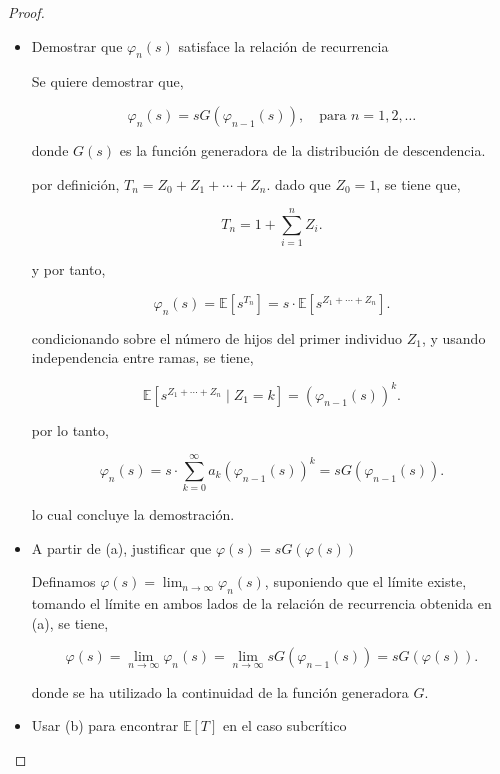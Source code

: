 \documentclass{article}
\begin{document}
\begin{proof}
\begin{itemize}
\item[(a)] Demostrar que \( \varphi_n(s) \) satisface la relación de recurrencia

Se quiere demostrar que,

\[
\varphi_n(s) = s G(\varphi_{n-1}(s)), \quad \text{para } n = 1, 2, \ldots
\]

donde \( G(s) \) es la función generadora de la distribución de descendencia.

por definición, \( T_n = Z_0 + Z_1 + \cdots + Z_n \). dado que \( Z_0 = 1 \), se tiene que,

\[
T_n = 1 + \sum_{i=1}^{n} Z_i.
\]

y por tanto,

\[
\varphi_n(s) = \mathbb{E}[s^{T_n}] = s \cdot \mathbb{E}[s^{Z_1 + \cdots + Z_n}].
\]

condicionando sobre el número de hijos del primer individuo \( Z_1 \), y usando independencia entre ramas, se tiene,

\[
\mathbb{E}[s^{Z_1 + \cdots + Z_n} \mid Z_1 = k] = \left( \varphi_{n-1}(s) \right)^k.
\]

por lo tanto,

\[
\varphi_n(s) = s \cdot \sum_{k=0}^{\infty} a_k \left( \varphi_{n-1}(s) \right)^k = s G(\varphi_{n-1}(s)).
\]

lo cual concluye la demostración.

    
\end{itemize}

\begin{itemize}

\item[(b)] A partir de (a), justificar que \( \varphi(s) = s G(\varphi(s)) \)

Definamos \( \varphi(s) = \lim_{n \to \infty} \varphi_n(s) \), suponiendo que el límite existe, tomando el límite en ambos lados de la relación de recurrencia obtenida en (a), se tiene,

\[
\varphi(s) = \lim_{n \to \infty} \varphi_n(s) = \lim_{n \to \infty} s G(\varphi_{n-1}(s)) = s G(\varphi(s)).
\]

donde se ha utilizado la continuidad de la función generadora \( G \).

\end{itemize}

\begin{itemize}
\item[(c)] Usar (b) para encontrar \( \mathbb{E}[T] \) en el caso subcrítico



\end{itemize}
\end{proof}
\end{document}
